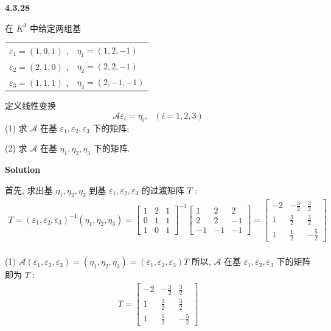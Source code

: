 \documentclass[11pt,a4paper,openany,oneside]{book}
\newcommand\Solution{\noindent\textbf{\textsf{Solution}}\par\medskip}
\begin{document}
\begin{myexample}
	\textbf{4.3.28}

在 $ K^3 $ 中给定两组基
\begin{center}
	\begin{tabular}{ll}
		 $ \varepsilon_1 = (1, 0, 1) $ ,  &   $ \eta_1 = (1, 2, -1) $   \\
		 $ \varepsilon_2 = (2, 1, 0) $ ,  &   $ \eta_2 = (2, 2, -1) $   \\
		 $ \varepsilon_3 = (1, 1, 1) $ ,  &   $ \eta_3 = (2, -1, -1) $ 
	\end{tabular}
\end{center}
定义线性变换
 $$  \mathcal{A}\varepsilon_i = \eta_i, \ \ \ (i=1, 2, 3)  $$ 
(1) 求 $ \mathcal{A} $ 在基 $ \varepsilon_1, \varepsilon_2, \varepsilon_3 $ 下的矩阵; 

(2) 求 $ \mathcal{A} $ 在基 $ \eta_1, \eta_2, \eta_3 $ 下的矩阵. \\ 

\end{myexample}
\Solution

首先, 求出基 $ \eta_1, \eta_2, \eta_3 $ 到基 $ \varepsilon_1, \varepsilon_2, \varepsilon_3 $ 的过渡矩阵 $ T $ :
\begin{gather*}
T = (\varepsilon_1, \varepsilon_2, \varepsilon_3)^{-1}(\eta_1, \eta_2, \eta_3) =
\begin{bmatrix}
1  &  2  &  1  \\
0  &  1  &  1  \\
1  &  0  &  1  
\end{bmatrix}^{-1}
\begin{bmatrix}
1  &  2  &  2  \\
2  &  2  &  -1 \\
-1  &  -1  &  -1  
\end{bmatrix}=
\begin{bmatrix}
-2  &  -\frac{3}{2}  &  \frac{3}{2}  \\
1  &  \frac{3}{2}    &  \frac{3}{2}  \\
1  &  \frac{1}{2}    &  -\frac{5}{2}
\end{bmatrix}
\end{gather*} \\

(1)  $ \mathcal{A}(\varepsilon_1, \varepsilon_2, \varepsilon_3) = (\eta_1, \eta_2, \eta_3)=(\varepsilon_1, \varepsilon_2, \varepsilon_3)T $ 
所以,  $ \mathcal{A} $ 在基 $ \varepsilon_1, \varepsilon_2, \varepsilon_3 $ 下的矩阵即为 $ T $ :
\begin{gather*}
T=
\begin{bmatrix}
-2  &  -\frac{3}{2}  &  \frac{3}{2}  \\
1  &  \frac{3}{2}    &  \frac{3}{2}  \\
1  &  \frac{1}{2}    &  -\frac{5}{2}
\end{bmatrix}
\end{gather*} \\
\end{document}
